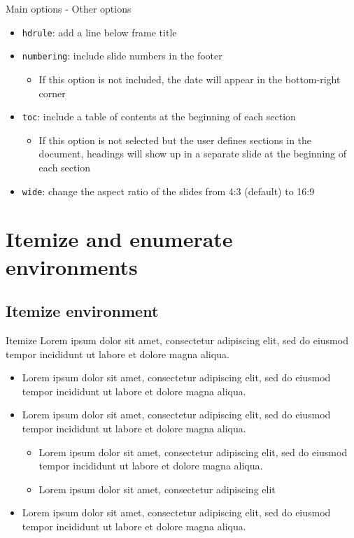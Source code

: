 \documentclass[10pt,numbering,toc]{bpslides}
\begin{document}
\begin{frame}{Main options - Other options}\label{firstslide}
\begin{itemize}
\item \texttt{hdrule}: add a line below frame title
\item \texttt{numbering}: include slide numbers in the footer
\begin{itemize}
\item If this option is not included, the date will appear in the bottom-right corner
\end{itemize}
\item \texttt{toc}: include a table of contents at the beginning of each section
\begin{itemize}
\item If this option is not selected but the user defines sections in the document, headings will show up in a separate slide at the beginning of each section
\end{itemize}
\item \texttt{wide}: change the aspect ratio of the slides from 4:3 (default) to 16:9
\end{itemize}
\end{frame}

\section{Itemize and enumerate environments}

\subsection{Itemize environment}

\begin{frame}{Itemize}\label{firstslide}
    Lorem ipsum dolor sit amet, consectetur adipiscing elit, sed do eiusmod tempor incididunt ut labore et dolore magna aliqua. 
	\begin{itemize}
	\item Lorem ipsum dolor sit amet, consectetur adipiscing elit, sed do eiusmod tempor incididunt ut labore et dolore magna aliqua.
	\item Lorem ipsum dolor sit amet, consectetur adipiscing elit, sed do eiusmod tempor incididunt ut labore et dolore magna aliqua.
	\begin{itemize}
	\item Lorem ipsum dolor sit amet, consectetur adipiscing elit, sed do eiusmod tempor incididunt ut labore et dolore magna aliqua.
	\item Lorem ipsum dolor sit amet, consectetur adipiscing elit
	\end{itemize}
	\item Lorem ipsum dolor sit amet, consectetur adipiscing elit, sed do eiusmod tempor incididunt ut labore et dolore magna aliqua.
	\end{itemize}
\end{frame}
\end{document}
